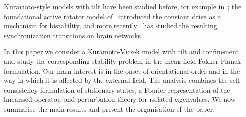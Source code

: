 \documentclass[a4paper,11pt]{article}
\theoremstyle{plain}
\theoremstyle{definition}
\theoremstyle{remark}
\begin{document}
Kuramoto-style models with tilt have been studied before, for example in~\cite{buendia2021hybrid, cheng2015long, ohta2008critical}; the foundational active rotator model of~\cite{shinomoto1986phase} introduced the constant drive as a mechanism for bistability, and more recently~\cite{odor2023synchronization} has studied the resulting synchronization transitions on brain networks.

In this paper we consider a Kuramoto-Vicsek model with tilt and confinement and study the corresponding stability problem in the mean-field Fokker-Planck formulation. Our main interest is in the onset of orientational order and in the way in which it is affected by the external field. The analysis combines the self-consistency formulation of stationary states, a Fourier representation of the linearised operator, and perturbation theory for isolated eigenvalues.
We now summarise the main results and present the organisation of the paper.
\end{document}
